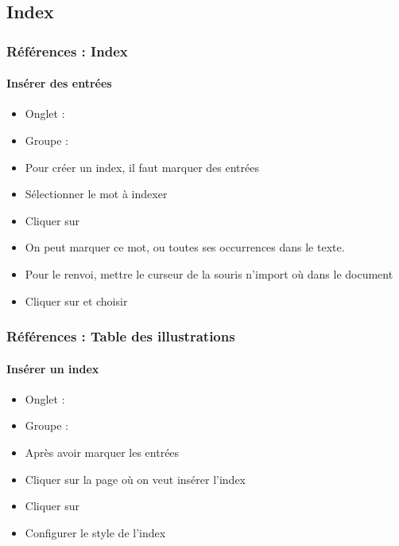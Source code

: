 \documentclass[xcolor=table]{beamer}
\begin{document}
\subsection{Index}

\begin{frame}[t]
\frametitle{Références : Index}
\framesubtitle{Insérer des entrées}

\begin{minipage}{0.69\textwidth}
\begin{itemize}
	\item Onglet : 
	\item Groupe : 
	\item Pour créer un index, il faut marquer des entrées 
	\item Sélectionner le mot à indexer 
	\item Cliquer sur 
	\item On peut marquer ce mot, ou toutes ses occurrences dans le texte.
	\item Pour le renvoi, mettre le curseur de la  souris n'import où dans le document 
	\item Cliquer sur  et choisir 
\end{itemize}
\end{minipage}
\begin{minipage}{0.30\textwidth}
\begin{flushright}
\end{flushright}
\vspace{-6pt}

\end{minipage}

\end{frame}

\begin{frame}[t]
\frametitle{Références : Table des illustrations}
\framesubtitle{Insérer un index}

\begin{minipage}{0.61\textwidth}
\begin{itemize}
	\item Onglet : 
	\item Groupe : 
	\item Après avoir marquer les entrées
	\item Cliquer sur la page où on veut insérer l'index
	\item Cliquer sur 
	\item Configurer le style de l'index
\end{itemize}
\end{minipage}
\begin{minipage}{0.38\textwidth}
\begin{flushright}
\end{flushright}
\vspace{-6pt}

\end{minipage}

\end{frame}
\end{document}
